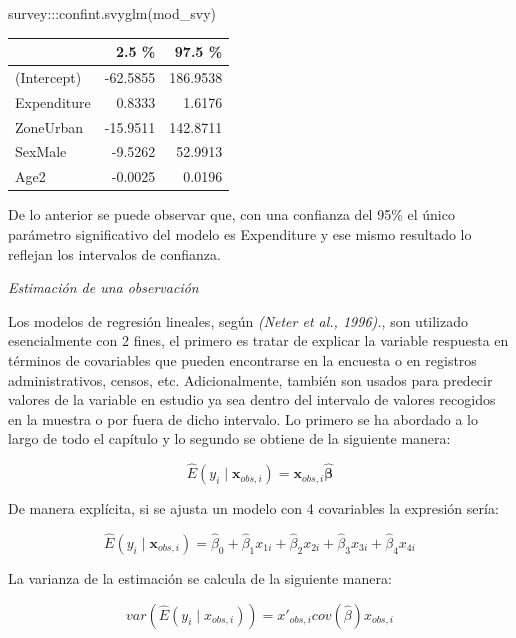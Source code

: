\documentclass[
  12pt,
]{book}
\newenvironment{Shaded}{\begin{snugshade}}{\end{snugshade}}
\newcommand{\FunctionTok}[1]{\textcolor[rgb]{0.00,0.00,0.00}{#1}}
\newcommand{\NormalTok}[1]{#1}
\newcommand{\SpecialCharTok}[1]{\textcolor[rgb]{0.00,0.00,0.00}{#1}}
\begin{document}
\begin{Shaded}
\begin{Highlighting}[]
\NormalTok{survey}\SpecialCharTok{:::}\FunctionTok{confint.svyglm}\NormalTok{(mod\_svy)}
\end{Highlighting}
\end{Shaded}

\begin{tabular}{l|r|r}
\hline
  & 2.5 \% & 97.5 \%\\
\hline
(Intercept) & -62.5855 & 186.9538\\
\hline
Expenditure & 0.8333 & 1.6176\\
\hline
ZoneUrban & -15.9511 & 142.8711\\
\hline
SexMale & -9.5262 & 52.9913\\
\hline
Age2 & -0.0025 & 0.0196\\
\hline
\end{tabular}

De lo anterior se puede observar que, con una confianza del 95\% el único parámetro significativo del modelo es Expenditure y ese mismo resultado lo reflejan los intervalos de confianza.

\emph{Estimación de una observación}

Los modelos de regresión lineales, según \emph{(Neter et al., 1996).}, son utilizado esencialmente con 2 fines, el primero es tratar de explicar la variable respuesta en términos de covariables que pueden encontrarse en la encuesta o en registros administrativos, censos, etc. Adicionalmente, también son usados para predecir valores de la variable en estudio ya sea dentro del intervalo de valores recogidos en la muestra o por fuera de dicho intervalo. Lo primero se ha abordado a lo largo de todo el capítulo y lo segundo se obtiene de la siguiente manera:

\[
\hat{E}(y_{i}\mid\boldsymbol{x}_{obs,i})=\boldsymbol{x}_{obs,i}\hat{\boldsymbol{\beta}}
\]

De manera explícita, si se ajusta un modelo con 4 covariables la expresión sería:

\[
\hat{E}(y_{i}\mid\boldsymbol{x}_{obs,i})=\hat{\beta}_{0}+\hat{\beta}_{1}x_{1i}+\hat{\beta}_{2}x_{2i}+\hat{\beta}_{3}x_{3i}+\hat{\beta}_{4}x_{4i}
\]

La varianza de la estimación se calcula de la siguiente manera:

\[
var\left(\hat{E}\left(y_{i}\mid x_{obs,i}\right)\right) 
=  x'_{obs,i}cov\left(\hat{\beta}\right)x{}_{obs,i}
\]
\end{document}
